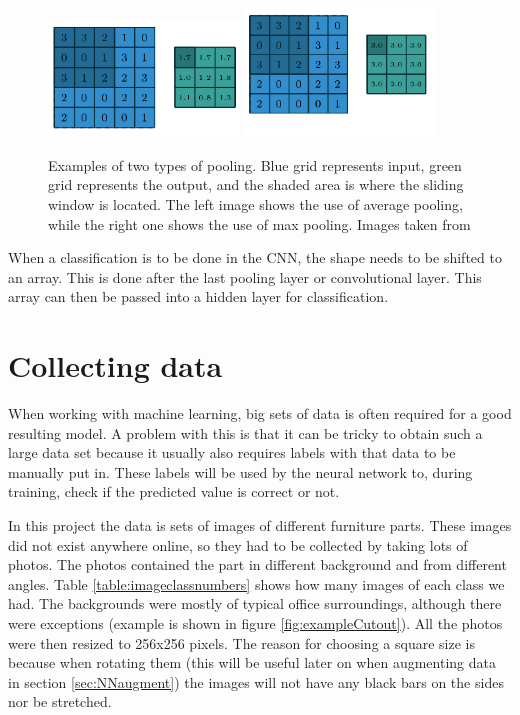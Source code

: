  \begin{figure}[hbtp]
\begin{center}
\includegraphics[width = 0.45\textwidth]{./Images/avgPool.png}
\includegraphics[width = 0.45\textwidth]{./Images/maxPool.png}
\caption{Examples of two types of pooling. Blue grid represents input, green grid represents the output, and the shaded area is where the sliding window is located. The left image shows the use of average pooling, while the right one shows the use of max pooling.
Images taken from \cite{convArit}}
\label{fig:pooling}
\end{center}
\end{figure} 
 
When a classification is to be done in the CNN, the shape needs to be shifted to an array. This is done after the last pooling layer or convolutional layer. This array can then be passed into a hidden layer for classification.


\section{Collecting data}
\label{sec:NNdata}
When working with machine learning, big sets of data is often required for a good resulting model.
A problem with this is that it can be tricky to obtain such a large data set because it usually also requires
labels with that data to be manually put in. These labels will be used by the neural network to, during training, check if
the predicted value is correct or not.

In this project the data is sets of images of different furniture parts. These images did not exist anywhere online, so they had to be collected by taking lots of photos. The photos contained the part in different background and from different angles. Table \ref{table:imageclassnumbers} shows how many images of each class we had. The backgrounds were mostly of typical office surroundings, although there were exceptions (example is shown in figure \ref{fig:exampleCutout}). All the photos were then resized to 256x256 pixels.
The reason for choosing a square size is because when rotating them
(this will be useful later on when augmenting data in section \ref{sec:NNaugment}) 
the images will not have any black bars on the sides nor be stretched.

